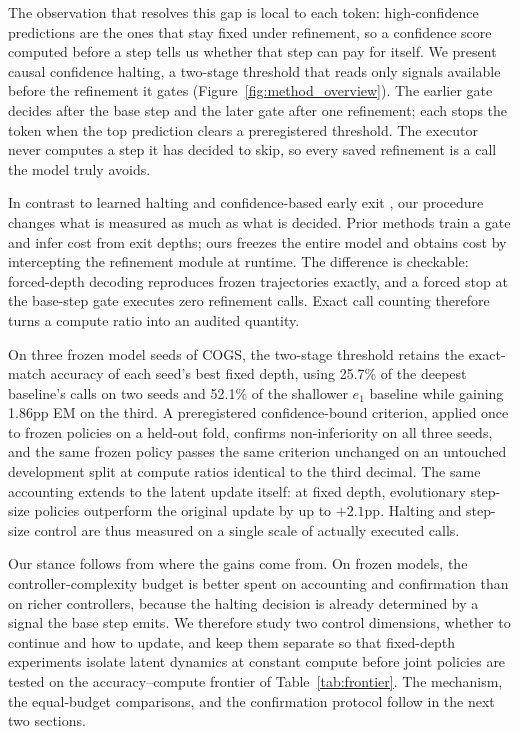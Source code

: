 ﻿\documentclass[11pt]{article}
\begin{document}
The observation that resolves this gap is local to each token: high-confidence predictions are the ones that stay fixed under refinement, so a confidence score computed before a step tells us whether that step can pay for itself. We present causal confidence halting, a two-stage threshold that reads only signals available before the refinement it gates (Figure~\ref{fig:method_overview}). The earlier gate decides after the base step and the later gate after one refinement; each stops the token when the top prediction clears a preregistered threshold. The executor never computes a step it has decided to skip, so every saved refinement is a call the model truly avoids.

In contrast to learned halting \citep{graves2016adaptive,banino2021ponder} and confidence-based early exit \citep{schuster2022calm}, our procedure changes what is measured as much as what is decided. Prior methods train a gate and infer cost from exit depths; ours freezes the entire model and obtains cost by intercepting the refinement module at runtime. The difference is checkable: forced-depth decoding reproduces frozen trajectories exactly, and a forced stop at the base-step gate executes zero refinement calls. Exact call counting therefore turns a compute ratio into an audited quantity.

On three frozen model seeds of COGS, the two-stage threshold retains the exact-match accuracy of each seed's best fixed depth, using 25.7\% of the deepest baseline's calls on two seeds and 52.1\% of the shallower $e_1$ baseline while gaining 1.86pp EM on the third. A preregistered confidence-bound criterion, applied once to frozen policies on a held-out fold, confirms non-inferiority on all three seeds, and the same frozen policy passes the same criterion unchanged on an untouched development split at compute ratios identical to the third decimal. The same accounting extends to the latent update itself: at fixed depth, evolutionary step-size policies outperform the original update by up to $+2.1$pp. Halting and step-size control are thus measured on a single scale of actually executed calls.

Our stance follows from where the gains come from. On frozen models, the controller-complexity budget is better spent on accounting and confirmation than on richer controllers, because the halting decision is already determined by a signal the base step emits. We therefore study two control dimensions, whether to continue and how to update, and keep them separate so that fixed-depth experiments isolate latent dynamics at constant compute before joint policies are tested on the accuracy--compute frontier of Table~\ref{tab:frontier}. The mechanism, the equal-budget comparisons, and the confirmation protocol follow in the next two sections.
\end{document}
